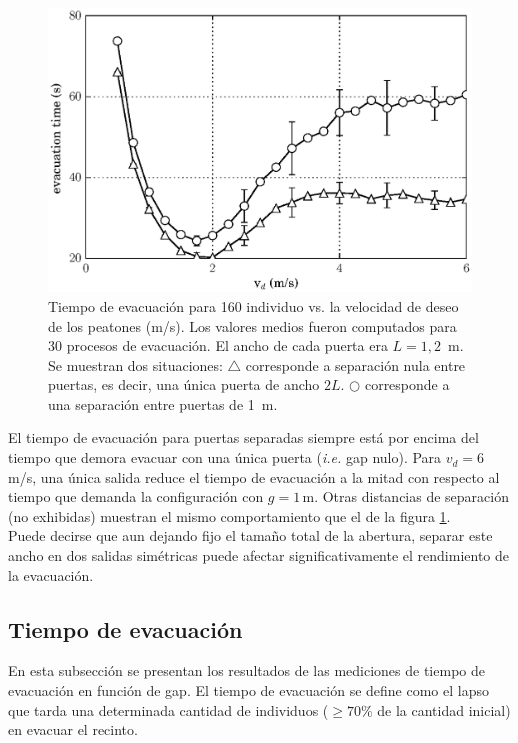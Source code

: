\begin{figure}[H]
    \centering
    \includegraphics[scale=0.8]{figuras/fis_g.eps}
    \caption[width=5cm]{Tiempo de evacuación para 160 individuo vs. la velocidad de deseo de los peatones (m/s). Los valores medios fueron computados para 30 procesos de evacuación. El ancho de cada puerta era $L=1,2$~m. Se muestran dos situaciones:  $\bigtriangleup$ corresponde a separación nula entre puertas, es decir, una única puerta de ancho  $2L$. $\bigcirc$ corresponde a una separación entre puertas de 1~m.}
    \label{fis_g}
\end{figure}

El tiempo de evacuación para puertas separadas siempre está por encima del tiempo que demora evacuar con una única puerta (\emph{i.e.} gap nulo). Para $v_d=6\,$m/s, una única salida reduce el tiempo de evacuación a la mitad con respecto al tiempo que demanda la configuración con $g=1\,$m. Otras distancias de separación (no exhibidas) muestran el mismo comportamiento que el de la figura \ref{fis_g}.\\

Puede decirse que aun dejando fijo el tamaño total de la abertura, separar este ancho en dos salidas simétricas puede afectar significativamente el rendimiento de la evacuación.

\subsection{Tiempo de evacuación}

En esta subsección se presentan los resultados de las mediciones de tiempo de evacuación en función de gap.
El tiempo de evacuación se define como el lapso que tarda una determinada cantidad de individuos ($\ge70\%$ de la cantidad inicial) en evacuar el recinto. \\

